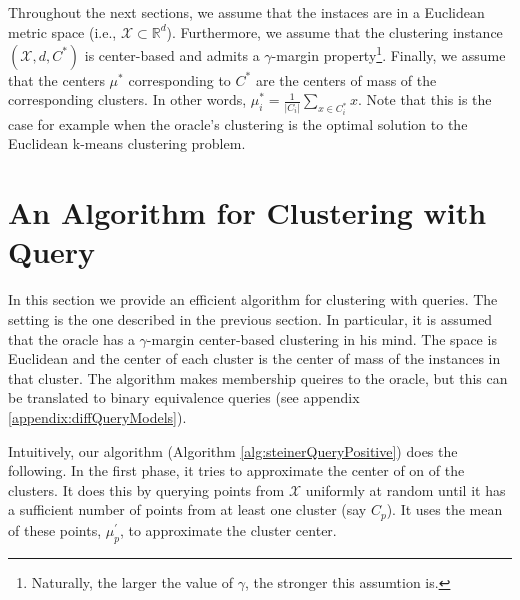 \documentclass[orivec]{llncs}
\newcommand{\mc}{\mathcal}
\begin{document}
Throughout the next sections, we assume that the instaces are in a Euclidean metric space (i.e., $\mc X\subset \mathbb{R}^d$). Furthermore, we assume that the clustering instance $(\mc X, d, C^*)$ is center-based and admits a $\gamma$-margin property\footnote{Naturally, the larger the value of $\gamma$, the stronger this assumtion is.}. Finally, we assume that the centers $\mu^*$ corresponding to $C^*$ are the centers of mass of the corresponding clusters. In other words, $\mu^*_i=\frac{1}{|C_i|}\sum_{x\in C^*_i} x$. Note that this is the case for example when the oracle's clustering is the optimal solution to the Euclidean k-means clustering problem.

\section{An Algorithm for Clustering with Query}
\label{section:clusteringWithQuery}

In this section we provide an efficient algorithm for clustering with queries. The setting is the one described in the previous section. In particular, it is assumed that the oracle has a $\gamma$-margin center-based clustering in his mind. The space is Euclidean and the center of each cluster is the center of mass of the instances in that cluster. The algorithm makes membership queires to the oracle, but this can be translated to binary equivalence queries (see appendix \ref{appendix:diffQueryModels}). 


Intuitively, our algorithm (Algorithm  \ref{alg:steinerQueryPositive}) does the following. In the first phase, it tries to approximate the center of on of the clusters. It does this by querying points from $\mc X$ uniformly at random until it has a sufficient number of points from at least one cluster (say $C_p$). It uses the mean of these points, $\mu_p^\prime$, to approximate the cluster center. 
\end{document}
